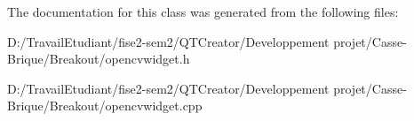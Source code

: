The documentation for this class was generated from the following files\+:\begin{DoxyCompactItemize}
\item 
D\+:/\+Travail\+Etudiant/fise2-\/sem2/\+Q\+T\+Creator/\+Developpement projet/\+Casse-\/\+Brique/\+Breakout/opencvwidget.\+h\item 
D\+:/\+Travail\+Etudiant/fise2-\/sem2/\+Q\+T\+Creator/\+Developpement projet/\+Casse-\/\+Brique/\+Breakout/opencvwidget.\+cpp\end{DoxyCompactItemize}
